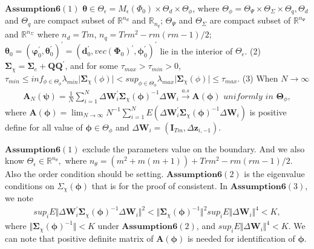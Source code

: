 \documentclass[12pt,a4paper,hyperref]{article}
\begin{document}
$\boldsymbol{Assumption 6} (1)$ $\boldsymbol{\theta} \in \Theta_{\epsilon}=M_{\epsilon}(\Phi_{0}) \times \Theta_{d} \times \Theta_{\phi}$, where $\Theta_{\phi}=\Theta_{\Psi} \times \Theta_{\Sigma} \times \Theta_{q}, \Theta_{d}$ and $\Theta_{q}$ are compact subset of $\mathbb{R}^{n_{d}}$ and $\mathbb{R}_{n_{q}}$; $\Theta_{\Psi}$ and $\Theta_{\Sigma}$ are compact subset of $\mathbb{R}^{n_{\Psi}}$ and $\mathbb{R}^{n_{\Sigma}} $ where $n_{d}=Tm$, $n_{q}=Trm^{2}-rm(rm-1)/2$; $\boldsymbol{\theta}_{0}=(\boldsymbol{\varphi}^{'}_{0}, \boldsymbol{\theta}^{'}_{0})^{'}=(\boldsymbol{d}^{'}_{0}, vec(\boldsymbol{\Phi}_{0})^{'}, \boldsymbol{\phi}^{'}_{0} )^{'}  $ lie in the interior of $\Theta_{\epsilon}$. (2) $\boldsymbol{\Sigma}_{\chi}=\boldsymbol{\Sigma}_{e}+\boldsymbol{QQ}^{'}$, and for some $\tau_{max}> \tau_{min}>0$, $\tau_{min}  \leq inf_{\phi \in \Theta_{\phi}}\lambda_{min} \vert \boldsymbol{\Sigma}_{\chi}(\phi) \vert< sup_{\phi \in \Theta_{\phi}} \lambda_{max} \vert \boldsymbol{\Sigma}_{\chi}(\phi) \vert \leq \tau_{max}$.
(3) When $N \longrightarrow \infty$
\begin{align}
\boldsymbol{A}_{N}(\boldsymbol{\psi})=\frac{1}{N}\sum^{N}_{i=1} \Delta \boldsymbol{W}^{'}_{i}\boldsymbol{\Sigma}_{\chi}(\boldsymbol{\phi})^{-1} \Delta \boldsymbol{W}_{i}\overset{a.s}{\to} \boldsymbol{A}(\boldsymbol{\phi}) \,\, uniformly \,\, in \,\, \boldsymbol{\Theta}_{\phi},
\end{align}
where $\boldsymbol{A}(\boldsymbol{\phi})=\lim_{N\to\infty} N^{-1} \sum^{N}_{i=1}E(\Delta \boldsymbol{W}^{'}_{i}\boldsymbol{\Sigma}_{\chi}(\boldsymbol{\phi})^{-1} \Delta \boldsymbol{W}_{i} )$ is positive define for all value of $\boldsymbol{\phi} \in \Theta_{\phi}$ and $\Delta \boldsymbol{W}_{i}=(\boldsymbol{I}_{Tm}, \Delta \boldsymbol{z}_{i,-1})$.

$\boldsymbol{Assumption 6} (1)$ exclude the parameters value on the boundary. And we  also know $\Theta_{\epsilon} \in \mathbb{R}^{n_{\theta}},$ where $n_{\theta}=(m^{2}+m(m+1))+Trm^{2}-rm(rm-1)/2$. Also the order condition should be setting.  $\boldsymbol{Assumption 6} (2)$ is the eigenvalue conditions on $\Sigma_{\chi}(\boldsymbol{\phi})$ that is for the proof of consistent. In $\boldsymbol{Assumption 6} (3)$,
we note
\begin{align}
sup_{i} E\Vert \Delta \boldsymbol{W}^{'}_{i}\boldsymbol{\Sigma}_{\chi}(\boldsymbol{\phi})^{-1}\Delta \boldsymbol{W}_{i} \Vert^{2} < \Vert \boldsymbol{\Sigma}_{\chi}(\boldsymbol{\phi})^{-1} \Vert^{2}sup_{i}E \Vert \Delta \boldsymbol{W}_{i}  \Vert^{4}< K,
\end{align}
where $ \Vert \boldsymbol{\Sigma}_{\chi}(\boldsymbol{\phi})^{-1} \Vert<K$ under $\boldsymbol{Assumption 6} (2)$, and $sup_{i} E \Vert \Delta \boldsymbol{W}_{i}  \Vert^{4}<K $. We can note that positive definite matrix of $\boldsymbol{A}(\boldsymbol{\phi})$ is needed for identification of $\boldsymbol{\phi}$.
\end{document}

